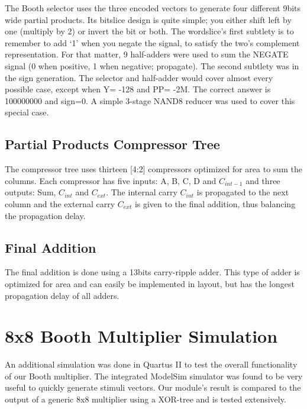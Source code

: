 \documentclass[conference]{IEEEtran}
\begin{document}
The Booth selector uses the three encoded vectors to generate four different 9bits wide
partial products. Its bitslice design is quite simple; you either shift left by one (multiply by 2) or
invert the bit or both. The wordslice's first subtlety is to remember to add `1' when you negate
the signal, to satisfy the two's complement representation. For that matter, 9 half-adders were
used to sum the NEGATE signal (0 when positive, 1 when negative; propagate). The second
subtlety was in the sign generation. The selector and half-adder would cover almost every
possible case, except when Y= -128 and PP= -2M. The correct answer is 100000000 and sign=0.
A simple 3-stage NAND8 reducer was used to cover this special case.



\subsection{Partial Products Compressor Tree}

The compressor tree uses thirteen [4:2] compressors optimized for area to
sum the columns. Each compressor has five inputs: A, B, C, D and $C_{int-1}$ and three outputs: Sum,
$C_{int}$ and $C_{ext}$. The internal carry $C_{int}$ is propagated to the next column and the external carry $C_{ext}$ is
given to the final addition, thus balancing the propagation delay.


\subsection{Final Addition}

The final addition is done using a 13bits carry-ripple adder. This type of adder is
optimized for area and can easily be implemented in layout, but has the longest propagation
delay of all adders.


\section{8x8 Booth Multiplier Simulation}

An additional simulation was done in Quartus II to test the overall functionality of our Booth
multiplier. The integrated ModelSim simulator was found to be very useful to quickly generate
stimuli vectors. Our module’s result is compared to the output of a generic 8x8 multiplier using a
XOR-tree and is tested extensively.
\end{document}
